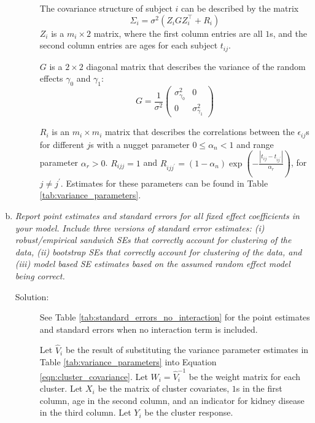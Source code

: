 \documentclass[11pt, letterpaper]{article}
\begin{document}
\begin{enumerate}[(a)]
\begin{description}
  The covariance structure of subject $i$ can be described by the matrix
  \begin{equation}
    \Sigma_i = \sigma^2\left(Z_iGZ_i^\intercal + R_i\right)
    \label{eqn:cluster_covariance}
  \end{equation}
  $Z_i$ is a $m_i \times 2$ matrix, where the first column entries are all $1$s,
  and the second column entries are ages for each subject $t_{ij}$.

  $G$ is a $2 \times 2$ diagonal matrix that describes the variance of the
  random effects $\gamma_0$ and $\gamma_1$:
  \begin{equation}
    G = \frac{1}{\sigma^2}\begin{pmatrix}
      \sigma^2_{\gamma_0} & 0 \\
      0 & \sigma^2_{\gamma_1}
    \end{pmatrix}
    \label{eqn:random_effects_covariance}
  \end{equation}

  $R_i$ is an $m_i \times m_i$ matrix that describes the correlations between
  the $\epsilon_{ij}$s for different $j$s with a nugget parameter
  $0 \leq \alpha_n < 1$ and range parameter $\alpha_r > 0$. $R_{ijj} = 1$ and
  $R_{ijj^\prime} = \left(1 - \alpha_n\right) \exp\left(-\frac{\left\lvert
        t_{ij} - t_{ij^\prime}\right\rvert}{\alpha_r}\right)$, for
  $j \neq j^\prime$. Estimates for these parameters can be found in Table
  \ref{tab:variance_parameters}.
\end{description}

\item {\em  Report point estimates and standard errors for all fixed effect
coefficients in your model.  Include three versions of standard error estimates: (i) robust/empirical sandwich SEs that correctly
account for clustering of the data, (ii) bootstrap SEs that correctly account for clustering of the data, and (iii) model based SE estimates based on the assumed random effect model being correct.}



\begin{description}
\item[Solution:] See Table \ref{tab:standard_errors_no_interaction} for the
  point estimates and standard errors when no interaction term is included.

  Let $\hat{V}_i$ be the result of substituting the variance parameter estimates
  in Table \ref{tab:variance_parameters} into Equation
  \ref{eqn:cluster_covariance}. Let $W_i = \hat{V}_i^{-1}$ be the weight matrix
  for each cluster. Let $X_i$ be the matrix of cluster covariates, $1$s in the
  first column, age in the second column, and an indicator for kidney disease in
  the third column. Let $Y_i$ be the cluster response.


\end{description}
\end{enumerate}
\end{document}
